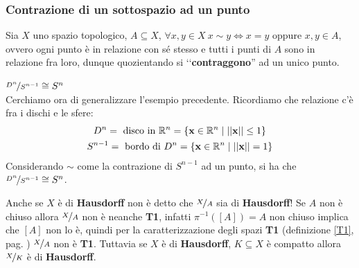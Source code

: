 \subsubsection{Contrazione di un sottospazio ad un punto}
Sia $X$ uno spazio topologico, $A\subseteq X$, $\forall x,y\in X \ x\sim y\iff x=y$ oppure $x,y\in A$, ovvero ogni punto è in relazione con sé stesso e tutti i punti di $A$ sono in relazione fra loro, dunque quozientando si ‘‘\textbf{contraggono}'' ad un unico punto.
\begin{example} $\nicefrac{D^n}{S^{n-1}}\cong S^n$ \\
	Cerchiamo ora di generalizzare l'esempio precedente. Ricordiamo che relazione c'è fra i dischi e le sfere:
		\begin{gather*}
			D^n=\text{ disco in } \mathbb{R}^n=\{\mathbf{x}\in\mathbb{R}^n \mid \left|\left| \mathbf{x} \right|\right| \leq 1 \}\\
			S^{n-1}=\text{ bordo di } D^n=\{\mathbf{x}\in\mathbb{R}^n \mid \left|\left| \mathbf{x} \right|\right| = 1 \}
		\end{gather*}
	Considerando $\sim$ come la contrazione di $S^{n-1}$ ad un punto, si ha che $\nicefrac{D^n}{S^{n-1}} \cong S^n$.
\end{example}

\begin{attention}
	Anche se $X$ è di \textbf{Hausdorff} non è detto che $\nicefrac{X}{A}$ sia di \textbf{Hausdorff}!\newline
	Se $A$ non è chiuso allora $\nicefrac{X}{A}$ non è neanche \textbf{T1}, infatti $\pi^{-1}([A])=A$ non chiuso implica che $[A]$ non lo è, quindi per la caratterizzazione degli spazi \textbf{T1} (definizione \ref{T1}, pag. \pageref{T1}) $\nicefrac{X}{A}$ non è \textbf{T1}.\newline
	Tuttavia se $X$ è di \textbf{Hausdorff}, $K\subseteq X$ è compatto allora $\nicefrac{X}{K}$ è di \textbf{Hausdorff}.
\end{attention}
